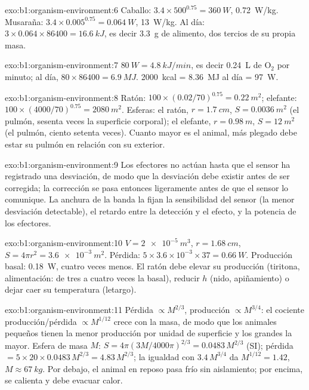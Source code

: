 \begin{solution}{exo:b1:organism-environment:6}
Caballo: $3.4\times 500^{0.75} = \qty{360}{W}$, \qty{0.72}{W/kg}. Musaraña:
$3.4\times 0.005^{0.75} = \qty{0.064}{W}$, \qty{13}{W/kg}. Al día:
$3\times 0.064\times 86400 = \qty{16.6}{kJ}$, es decir \qty{3.3}{g} de
alimento, dos tercios de su propia masa.
\end{solution}

\begin{solution}{exo:b1:organism-environment:7}
$\qty{80}{W} = \qty{4.8}{kJ/min}$, es decir \qty{0.24}{L} de $\mathrm{O_2}$
por minuto; al día, $80\times 86400 = \qty{6.9}{MJ}$. \qty{2000}{kcal}
= \qty{8.36}{MJ} al día = \qty{97}{W}.
\end{solution}

\begin{solution}{exo:b1:organism-environment:8}
Ratón: $100\times(0.02/70)^{0.75} = \qty{0.22}{m^2}$; elefante:
$100\times(4000/70)^{0.75} = \qty{2080}{m^2}$. Esferas: el ratón,
$r = \qty{1.7}{cm}$, $S = \qty{0.0036}{m^2}$ (el pulmón, sesenta veces la
superficie corporal); el elefante, $r = \qty{0.98}{m}$, $S = \qty{12}{m^2}$
(el pulmón, ciento setenta veces). Cuanto mayor es el animal, más plegado
debe estar su pulmón en relación con su exterior.
\end{solution}

\begin{solution}{exo:b1:organism-environment:9}
Los efectores no actúan hasta que el sensor ha registrado una desviación, de
modo que la desviación debe existir antes de ser corregida; la corrección se
pasa entonces ligeramente antes de que el sensor lo comunique. La anchura de
la banda la fijan la sensibilidad del sensor (la menor desviación
detectable), el retardo entre la detección y el efecto, y la potencia de los
efectores.
\end{solution}

\begin{solution}{exo:b1:organism-environment:10}
$V = \qty{2e-5}{m^3}$, $r = \qty{1.68}{cm}$, $S = 4\pi r^2 =
\qty{3.6e-3}{m^2}$. Pérdida: $5\times 3.6\times 10^{-3}\times 37 =
\qty{0.66}{W}$. Producción basal: \qty{0.18}{W}, cuatro veces menos. El
ratón debe elevar su producción (tiritona, alimentación: de tres a cuatro
veces la basal), reducir $h$ (nido, apiñamiento) o dejar caer su temperatura
(letargo).
\end{solution}

\begin{solution}{exo:b1:organism-environment:11}
Pérdida $\propto M^{2/3}$, producción $\propto M^{3/4}$: el cociente
producción/pérdida $\propto M^{1/12}$ crece con la masa, de modo que los
animales pequeños tienen la menor producción por unidad de superficie y los
grandes la mayor. Esfera de masa $M$:
$S = 4\pi(3M/4000\pi)^{2/3} = \num{0.0483}\,M^{2/3}$ (SI); pérdida
$= 5\times 20\times 0.0483\,M^{2/3} = 4.83\,M^{2/3}$; la igualdad con
$3.4\,M^{3/4}$ da $M^{1/12} = 1.42$, $M \approx \qty{67}{kg}$. Por debajo,
el animal en reposo pasa frío sin aislamiento; por encima, se calienta y
debe evacuar calor.
\end{solution}

